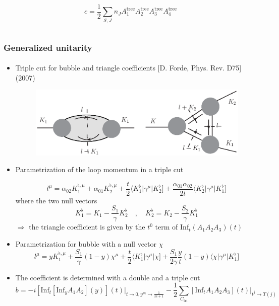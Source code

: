 \documentclass[english]{beamer}
\newcommand{\Inf}{\mathrm{Inf}}
\begin{document}
\begin{frame}[shrink=20]
\begin{itemize}
\begin{columns}
\begin{column}{0.5\textwidth}
\begin{equation*}
c = \frac{1}{2}\sum_{\mathcal{S}, J}n_J A_1^{\mathrm{tree}}A_2^{\mathrm{tree}}A_3^{\mathrm{tree}}A_4^{\mathrm{tree}}
\end{equation*}
\end{column}
\end{columns}


\end{itemize}

\end{frame}
\begin{frame}[shrink=20]
\frametitle{Generalized unitarity}
\framesubtitle{}
\begin{itemize}
\item<1-> Triple cut for bubble and triangle coefficients
\tiny\color{blue}
[D. Forde, Phys. Rev. D75]
(2007)
\color{black}\normalsize
\begin{figure}[h]
  \centering
  \includegraphics[width=0.7\linewidth]{triple_cut.eps}
\end{figure}

\item<2-> Parametrization of the loop momentum in a triple cut

\small
\begin{equation*}
l^\mu = \alpha_{02} K_1^{\flat,\mu} + \alpha_{01}K_2^{\flat,\mu} + \frac{t}{2}\langle K_1^\flat | \gamma^\mu |K_2^\flat] + \frac{\alpha_{01}\alpha_{02}}{2t}\langle K_2^\flat|\gamma^\mu |K_1^\flat]
\end{equation*}
\normalsize
where the two null vectors
\small
\begin{equation*}
K_1^\flat = K_1 - \frac{S_1}{\gamma}K_2^\flat \quad,\quad
K_2^\flat = K_2 - \frac{S_2}{\gamma}K_1^\flat
\end{equation*}
\normalsize
$\Rightarrow$ the triangle coefficient is given by the $t^0$ term of $\mathrm{Inf}_t(A_1A_2A_3)(t)$

\item<3-> Parametrization for bubble with a null vector $\chi$
\small
\begin{equation*}
l^\mu = yK_1^{\flat,\mu} + \frac{S_1}{\gamma}(1-y)\chi^\mu + \frac{t}{2}\langle K_1^\flat|\gamma^\mu|\chi] + \frac{S_1}{2\gamma}\frac{y}{t}(1-y)\langle \chi|\gamma^\mu|K_1^\flat]
\end{equation*}
\normalsize
\item<4->[]
The coefficient is determined with a double and a triple cut
\begin{equation*}
b = -i[\Inf_t[\Inf_y A_1 A_2](y)](t)\big|_{t\rightarrow 0 , y^m\rightarrow \frac{1}{m+1}}
-\frac{1}{2}\sum_{C_{\mathrm{tri}}}[\Inf_t A_1A_2A_3](t)\big|_{t^j\rightarrow T(j)}
\end{equation*} 


\end{itemize}
\end{frame}
\end{document}
